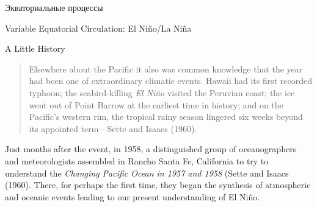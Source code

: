 \begin{chapter}{Экваториальные процессы}
\begin{section}{Variable Equatorial Circulation: El Ni\~{n}o/La Ni\~{n}a}
\begin{paragraph}{A Little History}
\begin{quotation}
Elsewhere about the Pacific it also was common knowledge that the year
had been one of extraordinary climatic events. Hawaii had its first
recorded typhoon; the seabird-killing \textit{El Ni\~{n}o} visited the
Peruvian coast; the ice went out of Point Barrow at the earliest time
in history; and on the Pacific's western rim, the tropical rainy
season lingered six weeks beyond its appointed term---Sette and Isaacs
(1960).
%
\end{quotation}

Just months after the event, in 1958, a distinguished group of
oceanographers and meteorologists assembled in Rancho Santa Fe,
California to try to understand the \textit{Changing Pacific Ocean in
1957 and 1958} (Sette and Isaacs (1960). There, for perhaps the first
time, they began the synthesis of atmospheric and oceanic events
leading to our present understanding of El Ni\~{n}o.
%


\end{paragraph}
\end{section}
\end{chapter}

